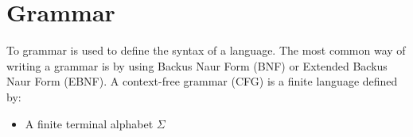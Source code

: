 \section{Grammar}
To grammar is used to define the syntax of a language. The most common way of writing a grammar is by using Backus Naur Form (BNF) or Extended Backus Naur Form (EBNF). A context-free grammar (CFG) is a finite language defined by:
\begin{itemize}
\item A finite terminal alphabet $\Sigma$ 
\end{itemize}